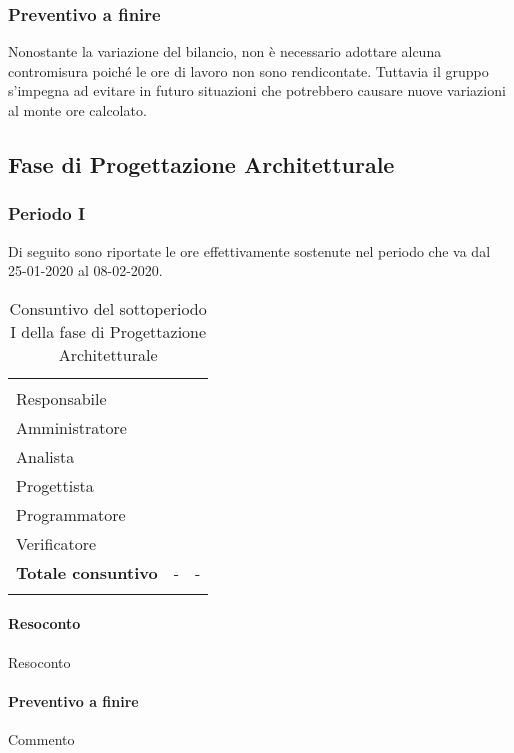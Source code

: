 \subsubsection{Preventivo a finire}
Nonostante la variazione del bilancio, non è necessario adottare alcuna contromisura poiché le ore di lavoro non sono rendicontate. Tuttavia il gruppo s'impegna ad evitare in futuro situazioni che potrebbero causare nuove variazioni al monte ore calcolato.

\subsection{Fase di Progettazione Architetturale}

\subsubsection{Periodo I}

Di seguito sono riportate le ore effettivamente sostenute nel periodo che va dal 25-01-2020 al 08-02-2020.

\begin{longtable}{ C{4cm} C{3cm} C{3.5cm}} 
 	 &
 	 &
 	 \\
 	
 	Responsabile &  & \\
 	Amministratore &  & \\
 	Analista & & \\
 	Progettista & & \\
 	Programmatore & &\\
 	Verificatore & & \\
 	
	\hline 	
 	
 	\textbf{Totale consuntivo} &
	- \color{coloreRosso}{\textbf{(+--)}} &
 	- \\	
 	
 	\caption{Consuntivo del sottoperiodo I della fase di Progettazione Architetturale}
\end{longtable}

\vspace{-1cm}

\paragraph{Resoconto}
Resoconto
\paragraph{Preventivo a finire}
Commento

